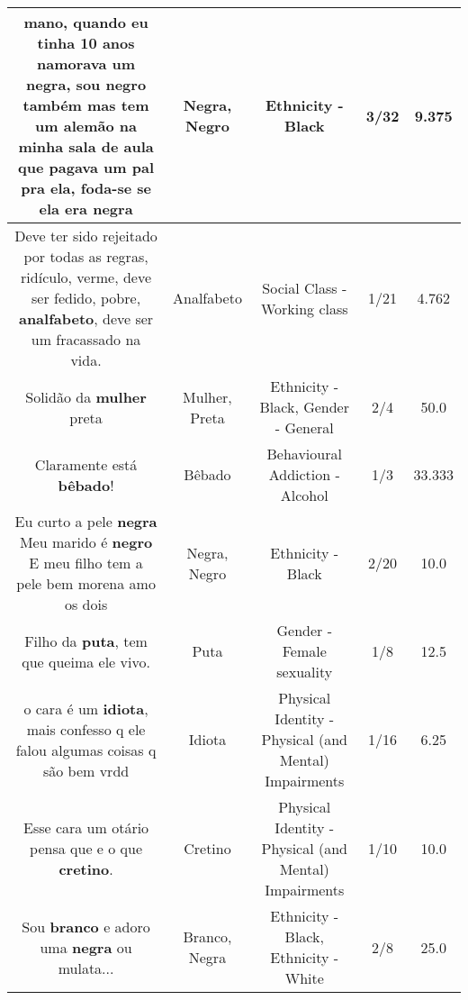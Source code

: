 \documentclass[11pt]{article}
\newlength\mylength
\begin{document}
\begin{center}
\begin{longtable}{|C{.65\mylength}|C{.30\mylength}|C{.12\mylength}|C{.12\mylength}|C{.12\mylength}|}
  \small mano, quando eu tinha 10 anos namorava um \textbf{negra}, sou \textbf{negro} também mas  tem um alemão na minha sala de aula que pagava um pal pra ela, foda-se se ela era negra\normalsize   & Negra, Negro & Ethnicity - Black & 3/32 & 9.375 \\  \hline
  \small Deve ter sido rejeitado por todas as regras,  ridículo,  verme, deve ser fedido,  pobre, \textbf{analfabeto}, deve ser  um fracassado  na vida.\normalsize   & Analfabeto & Social Class - Working class & 1/21 & 4.762 \\  \hline
  \small Solidão da \textbf{mulher} preta\normalsize   & Mulher, Preta & Ethnicity - Black, Gender - General & 2/4 & 50.0 \\  \hline
  \small Claramente está \textbf{bêbado}!\normalsize   & Bêbado & Behavioural Addiction - Alcohol & 1/3 & 33.333 \\  \hline
  \small Eu curto a pele \textbf{negra} Meu marido é \textbf{negro} E meu filho tem a pele bem morena amo os dois\normalsize   & Negra, Negro & Ethnicity - Black & 2/20 & 10.0 \\  \hline
  \small Filho da \textbf{puta}, tem que queima ele vivo.\normalsize   & Puta & Gender - Female sexuality & 1/8 & 12.5 \\  \hline
  \small o cara é um \textbf{idiota}, mais confesso q ele falou algumas coisas q são bem vrdd\normalsize   & Idiota & Physical Identity - Physical (and Mental) Impairments & 1/16 & 6.25 \\  \hline
  \small Esse cara um otário pensa que e o que \textbf{cretino}.\normalsize   & Cretino & Physical Identity - Physical (and Mental) Impairments & 1/10 & 10.0 \\  \hline
  \small Sou \textbf{branco} e adoro uma \textbf{negra} ou mulata...\normalsize   & Branco, Negra & Ethnicity - Black, Ethnicity - White & 2/8 & 25.0 \\  \hline

\end{longtable}
\end{center}
\end{document}

